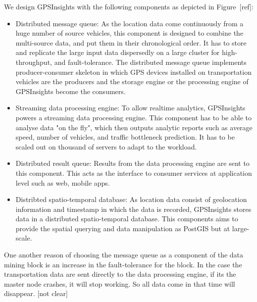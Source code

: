 \documentclass{acm_proc_article-sp}
\begin{document}

We design GPSInsights with the following components as depicted in Figure~[ref]:

\begin{itemize}
\item 	Distributed message queue: As the location data come continuously from a huge number of source vehicles, this component is designed to combine the multi-source data, and put them in their chronological order. It has to store and replicate the large input data dispersedly on a large cluster for high-throughput, and fault-tolerance. The distributed message queue implements producer-consumer skeleton in which GPS devices installed on transportation vehicles are the producers and the storage engine or the processing engine of GPSInsights become the consumers.

\item  Streaming data processing engine: To allow realtime analytics, GPSInsights powers a streaming data processing engine. This component has to be able to analyse data "on the fly", which then outputs analytic reports such as average speed, number of vehicles, and traffic bottleneck prediction. It has to be scaled out on thousand of servers to adapt to the workload.

\item  Distributed result queue: Results from the data processing engine are sent to this component. This acts as the interface to consumer services at application level such as web, mobile apps. 

\item  Distribted spatio-temporal database: As location data consist of geolocation information and timestamp in which the data is recorded, GPSInsights stores data in a distributed spatio-temporal database. This components aims to provide the spatial querying and data manipulation as PostGIS but at large-scale. 

\end{itemize}

One another reason of choosing the message queue as a component of the data mining block is an increase in the fault-tolerance for the block. In the case the transportation data are sent directly to the data processing engine, if its the master node crashes, it will stop working. So all data come in that time will disappear. [not clear]
\end{document}
